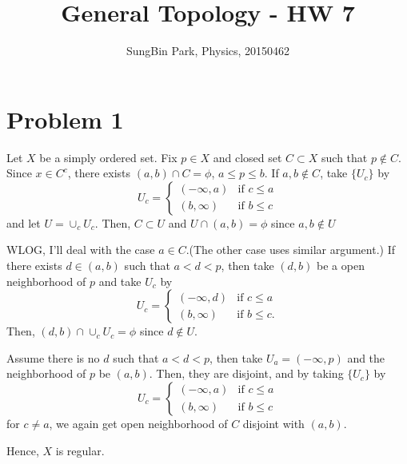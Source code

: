 \documentclass{article}
\begin{document}
\title{General Topology - HW 7}
\author{SungBin Park, Physics, 20150462} 

 \maketitle
\section*{Problem 1}
Let $X$ be a simply ordered set. Fix $p\in X$ and closed set $C\subset X$ such that $p\notin C$. Since $x\in C^c$, there exists $(a,b)\cap C=\phi$, $a\leq p\leq b$. If $a,b\notin C$, take $\{U_c\}$ by
\begin{equation*}
U_c=\begin{cases}
(-\infty, a) & \text{if }c \leq a \\
(b, \infty) & \text{if }b \leq c
\end{cases}
\end{equation*}
and let $U=\cup_c U_c$. Then, $C\subset U$ and $U\cap (a,b)=\phi$ since $a,b\notin U$

WLOG, I'll deal with the case $a\in C$.(The other case uses similar argument.) If there exists $d\in (a,b)$ such that $a<d<p$, then take $(d,b)$ be a open neighborhood of $p$ and take $U_c$ by
\begin{equation*}
U_c=\begin{cases}
(-\infty, d) & \text{if }c \leq a \\
(b, \infty) & \text{if }b \leq c.
\end{cases}
\end{equation*}
Then, $(d,b)\cap \cup_c U_c=\phi$ since $d\notin U$.

Assume there is no $d$ such that $a<d<p$, then take $U_a=(-\infty, p)$ and the neighborhood of $p$ be $(a, b)$. Then, they are disjoint, and by taking $\{U_c\}$ by
\begin{equation*}
U_c=\begin{cases}
(-\infty, a) & \text{if }c \leq a \\
(b, \infty) & \text{if }b \leq c
\end{cases}
\end{equation*}
for $c\neq a$, we again get open neighborhood of $C$ disjoint with $(a,b)$. 

Hence, $X$ is regular.
\end{document}
